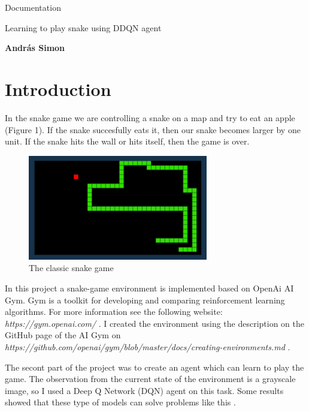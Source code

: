 \documentclass[12p]{article}
\begin{document}
  \begin{center}
    {\Huge Documentation}
    \par
    \vspace{40px}
    {\huge Learning to play snake using DDQN agent}
    \par
    \vspace{80px}
    {\LARGE \textbf{András Simon}}
  \end{center}

   
  \restoregeometry

  \tableofcontents
  \newpage

  \section{Introduction}
    In the snake game we are controlling a snake on a map and try to eat an apple (Figure 1).
    If the snake succesfully eats it,
    then our snake becomes larger by one unit. If the snake hits the
    wall or hits itself, then the game is over. 

    \begin{figure}[h]
    \includegraphics[width=0.7\textwidth]{snake}
    \centering
    \caption{The classic snake game}
    \centering
    \end{figure}

    \par
    In this project a snake-game environment is implemented based on OpenAi AI Gym. 
    Gym is a toolkit for developing and comparing reinforcement learning algorithms.
    For more information see the following website: \textit{https://gym.openai.com/} .
    I created the environment using the description on the GitHub page of the AI Gym on
    \textit{https://github.com/openai/gym/blob/master/docs/creating-environments.md} .
    \par
    The secont part of the project was to create an agent which can learn to play the game.
    The observation from the current state of the environment is a grayscale image, so I used
    a Deep Q Network (DQN) agent on this task. Some results showed that these type of models can solve problems
    like this \cite{atari}.
\end{document}
